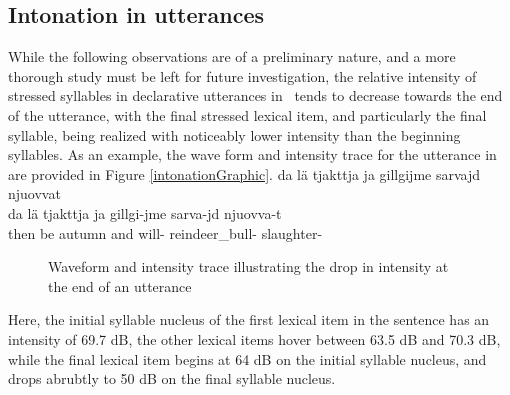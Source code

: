 \subsection{Intonation in utterances}\label{utteranceIntonation}
While the following observations are of a preliminary nature, and a more thorough study must be left for future investigation, the relative intensity of stressed syllables in declarative utterances in \PS\ tends to decrease towards the end of the utterance, with the final stressed lexical item, and particularly the final syllable, being realized with noticeably lower intensity than the beginning syllables. As an example, the wave form and intensity trace for the utterance in  are provided in Figure \vref{intonationGraphic}. %
\ea\label{intonationDropEx}
\glll	da lä tjakttja ja gillgijme sarvajd njuovvat\\
	da lä tjakttja ja gillgi-jme sarva-jd njuovva-t\\
	then be\BS{} autumn\BS{} and will- reindeer\_bull- slaughter-\\\nopagebreak
{} 
\z 
\setlength\fboxrule{0pt}
\begin{figure}
\caption{Waveform and intensity trace illustrating the drop in intensity at the end of an utterance}\label{intonationGraphic}
\end{figure}
Here, the initial syllable nucleus of the first lexical item in the sentence 
 has an intensity of 69.7 dB, the other lexical items hover between 63.5 dB and 70.3 dB, while the final lexical item  begins at 64 dB on the initial syllable nucleus, and drops abrubtly to 50 dB on the final syllable nucleus. 



